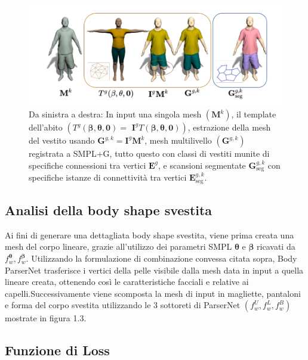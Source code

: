\begin{figure}[ht!]
  \centering
  \includegraphics[scale=1]{Images/SizerPic/ParserNet.png}
  \caption{Da sinistra a destra: In input una singola mesh $\left(\mathbf{M}^{k}\right)$, il template dell'abito $\left(T^{g}(\boldsymbol{\beta}, \boldsymbol{\theta}, \mathbf{0})=\right.$ $\left.\mathbf{I}^{g} T(\boldsymbol{\beta}, \boldsymbol{\theta}, \mathbf{0})\right)$, estrazione della mesh del vestito usando $\mathbf{G}^{g, k}=\mathbf{I}^{g} \mathbf{M}^{k}$, mesh multilivello $\left(\mathbf{G}^{g, k}\right)$ registrata a SMPL+G, tutto questo con classi di vestiti munite di specifiche connessioni tra vertici $\mathbf{E}^{g}$, e scansioni segmentate $\mathbf{G}_{\mathrm{seg}}^{g, k}$ con specifiche istanze di connettività tra vertici $\mathbf{E}_{\mathrm{seg}}^{g, k}$.}
  \label{fig:ParserNet}
\end{figure}

\medskip

\subsection{Analisi della body shape svestita}

\medskip

Ai fini di generare una dettagliata body shape svestita, viene prima creata una mesh del corpo lineare, grazie all'utilizzo dei parametri SMPL $\boldsymbol{\theta}$ e $\boldsymbol{\beta}$ ricavati da $f_{w}^{\boldsymbol{\theta}}, f_{w}^{\boldsymbol{\beta}}$. Utilizzando la formulazione di combinazione convessa citata sopra, Body ParserNet trasferisce i vertici della pelle visibile dalla mesh data in input a quella lineare creata, ottenendo così le caratteristiche facciali e relative ai capelli.Successivamente viene scomposta la mesh di input in magliette, pantaloni e forma del corpo svestita utilizzando le 3 sottoreti di ParserNet $\left(f_{w}^{U}, f_{w}^{L}, f_{w}^{B}\right)$ mostrate in figura 1.3.

\medskip

\subsection{Funzione di Loss}

